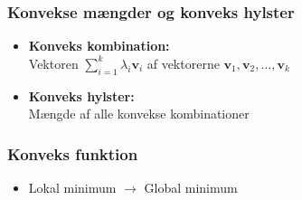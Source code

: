 \begin{frame}
\frametitle{Konvekse mængder og konveks hylster }
\begin{itemize}
\item \textbf{Konveks kombination: } \\ 
Vektoren $\sum_{i=1}^{k} \lambda_i \textbf{v}_i$ af vektorerne $\textbf{v}_1, \textbf{v}_2, \ldots, \textbf{v}_k$
\item \textbf{Konveks hylster: } \\
Mængde af alle konvekse kombinationer \\
\end{itemize}

\end{frame}

\begin{frame}
\frametitle{Konveks funktion}

\begin{itemize}
\item Lokal minimum $\rightarrow$ Global minimum
\end{itemize}
\end{frame}



%
%
%
%
